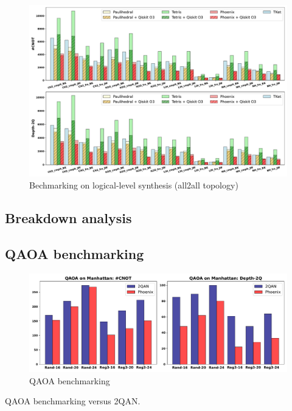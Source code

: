 \documentclass[conference]{IEEEtran}
\begin{document}
\begin{figure}[tbp]
    \centering
    \includegraphics[width=\columnwidth]{figures/all2all.pdf}
    \caption{Bechmarking on logical-level synthesis (all2all topology)}
    \label{fig:all2all}
\end{figure}


\subsection{Breakdown analysis}


\subsection{QAOA benchmarking}



\begin{figure}[tbp]
    \centering
    \includegraphics[width=\columnwidth]{figures/qaoa.pdf}
    \caption{QAOA benchmarking}
    \label{fig:qaoa}
\end{figure}



\begin{table}[btp]
    \centering
    \caption{QAOA benchmarking versus 2QAN.}
    \setlength{\tabcolsep}{4.2pt}
    \scalebox{0.8}{
        
    }
    \label{tab:qaoa}
\end{table}
\end{document}
